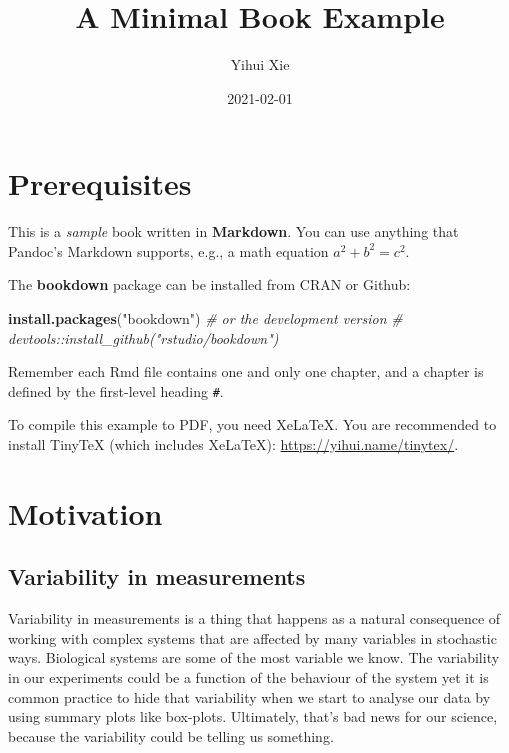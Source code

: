 \documentclass[
]{book}
\title{A Minimal Book Example}
\author{Yihui Xie}
\date{2021-02-01}
\newenvironment{Shaded}{\begin{snugshade}}{\end{snugshade}}
\newcommand{\CommentTok}[1]{\textcolor[rgb]{0.56,0.35,0.01}{\textit{#1}}}
\newcommand{\KeywordTok}[1]{\textcolor[rgb]{0.13,0.29,0.53}{\textbf{#1}}}
\newcommand{\NormalTok}[1]{#1}
\newcommand{\StringTok}[1]{\textcolor[rgb]{0.31,0.60,0.02}{#1}}
\begin{document}
\maketitle

{
\setcounter{tocdepth}{1}
\tableofcontents
}
\hypertarget{prerequisites}{%
\chapter{Prerequisites}\label{prerequisites}}

This is a \emph{sample} book written in \textbf{Markdown}. You can use anything that Pandoc's Markdown supports, e.g., a math equation \(a^2 + b^2 = c^2\).

The \textbf{bookdown} package can be installed from CRAN or Github:

\begin{Shaded}
\begin{Highlighting}[]
\KeywordTok{install.packages}\NormalTok{(}\StringTok{"bookdown"}\NormalTok{)}
\CommentTok{# or the development version}
\CommentTok{# devtools::install_github("rstudio/bookdown")}
\end{Highlighting}
\end{Shaded}

Remember each Rmd file contains one and only one chapter, and a chapter is defined by the first-level heading \texttt{\#}.

To compile this example to PDF, you need XeLaTeX. You are recommended to install TinyTeX (which includes XeLaTeX): \url{https://yihui.name/tinytex/}.

\hypertarget{motivation}{%
\chapter{Motivation}\label{motivation}}

\hypertarget{variability-in-measurements}{%
\section{Variability in measurements}\label{variability-in-measurements}}

Variability in measurements is a thing that happens as a natural consequence of working with complex systems that are affected by many variables in stochastic ways. Biological systems are some of the most variable we know. The variability in our experiments could be a function of the behaviour of the system yet it is common practice to hide that variability when we start to analyse our data by using summary plots like box-plots. Ultimately, that's bad news for our science, because the variability could be telling us something.
\end{document}
